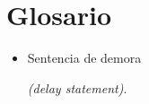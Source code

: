 \section{Glosario}

\begin{itemize}
    \item \hypertarget{delay_statement}{Sentencia de demora} \emph{(delay statement)}.
\end{itemize}